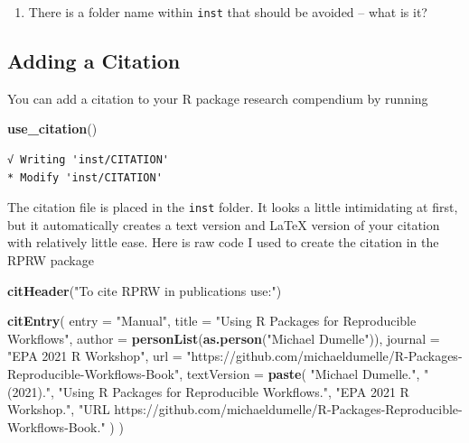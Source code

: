 \documentclass[
]{book}
\newenvironment{Shaded}{\begin{snugshade}}{\end{snugshade}}
\newcommand{\DataTypeTok}[1]{\textcolor[rgb]{0.13,0.29,0.53}{#1}}
\newcommand{\KeywordTok}[1]{\textcolor[rgb]{0.13,0.29,0.53}{\textbf{#1}}}
\newcommand{\NormalTok}[1]{#1}
\newcommand{\StringTok}[1]{\textcolor[rgb]{0.31,0.60,0.02}{#1}}
\providecommand{\tightlist}{%
  \setlength{\itemsep}{0pt}\setlength{\parskip}{0pt}}
\begin{document}
\begin{enumerate}
\def\labelenumi{\arabic{enumi}.}
\tightlist
\item
  There is a folder name within \texttt{inst} that should be avoided -- what is it?
\end{enumerate}

\hypertarget{citation}{%
\subsection{Adding a Citation}\label{citation}}

You can add a citation to your R package research compendium by running

\begin{Shaded}
\begin{Highlighting}[]
\KeywordTok{use_citation}\NormalTok{()}
\end{Highlighting}
\end{Shaded}

\begin{verbatim}
√ Writing 'inst/CITATION'
* Modify 'inst/CITATION'
\end{verbatim}

The citation file is placed in the \texttt{inst} folder. It looks a little intimidating at first, but it automatically creates a text version and LaTeX version of your citation with relatively little ease. Here is raw code I used to create the citation in the RPRW package

\begin{Shaded}
\begin{Highlighting}[]
\KeywordTok{citHeader}\NormalTok{(}\StringTok{"To cite RPRW in publications use:"}\NormalTok{)}

\KeywordTok{citEntry}\NormalTok{(}
  \DataTypeTok{entry    =} \StringTok{"Manual"}\NormalTok{,}
  \DataTypeTok{title    =} \StringTok{"Using R Packages for Reproducible Workflows"}\NormalTok{,}
  \DataTypeTok{author   =} \KeywordTok{personList}\NormalTok{(}\KeywordTok{as.person}\NormalTok{(}\StringTok{"Michael Dumelle"}\NormalTok{)),}
  \DataTypeTok{journal  =} \StringTok{"EPA 2021 R Workshop"}\NormalTok{,}
  \DataTypeTok{url      =} \StringTok{"https://github.com/michaeldumelle/R-Packages-Reproducible-Workflows-Book"}\NormalTok{,}
  \DataTypeTok{textVersion =}
  \KeywordTok{paste}\NormalTok{(}
    \StringTok{"Michael Dumelle."}\NormalTok{,}
    \StringTok{"(2021)."}\NormalTok{,}
    \StringTok{"Using R Packages for Reproducible Workflows."}\NormalTok{,}
    \StringTok{"EPA 2021 R Workshop."}\NormalTok{,}
    \StringTok{"URL https://github.com/michaeldumelle/R-Packages-Reproducible-Workflows-Book."}
\NormalTok{  )}
\NormalTok{)}
\end{Highlighting}
\end{Shaded}
\end{document}
